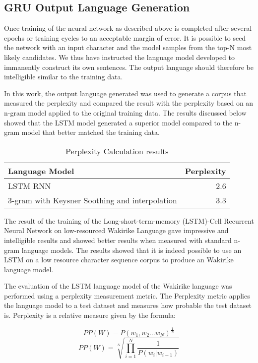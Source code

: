 \subsection{GRU Output Language Generation}
Once training of the neural network as described above is completed after several epochs or training cycles to an acceptable margin of error. It is possible to seed the network with an input character and the model samples from the top-N most likely candidates. We thus have instructed the language model developed to immanently construct its own sentences. The output language should therefore be intelligible similar to the training data.

In this work, the output language generated was used to generate a corpus that measured the perplexity and compared the result with the perplexity based on an n-gram model applied to the original training data. The results discussed below showed that the LSTM model generated a superior model compared to the n-gram model that better matched the training data.

\begin{table}
  \caption{Perplexity Calculation results}
  \label{tab:example}
\begin{tabular}{lr}
\toprule
Language Model & Perplexity\\
\midrule
LSTM RNN & 2.6\\
3-gram with Keysner Soothing and interpolation & 3.3\\
\bottomrule
\end{tabular}
\end{table}


The result of the training of the Long-short-term-memory (LSTM)-Cell Recurrent Neural Network on low-resourced Wakirike Language gave impressive and intelligible results and showed better results when measured with standard n-gram language models. The results showed that it is indeed possible to use an LSTM on a low resource character sequence corpus to produce an Wakirike language model.

The evaluation of the LSTM language model of the Wakirike language was performed using a perplexity measurement metric. The Perplexity metric applies the language model to a test dataset and measures how probable the test dataset is. Perplexity is a relative measure given by the formula:

%
\begin{equation}
PP(W)=P(w_1,w_2\dots w_N)^\frac{1}{N}
\label{eq6}
\end{equation}
%
%
\begin{equation}
PP(W)=\sqrt[N]{\prod_{i=1}^N\frac{1}{P(w_i|w_{i-1})}}
\label{eq7}
\end{equation}
%

